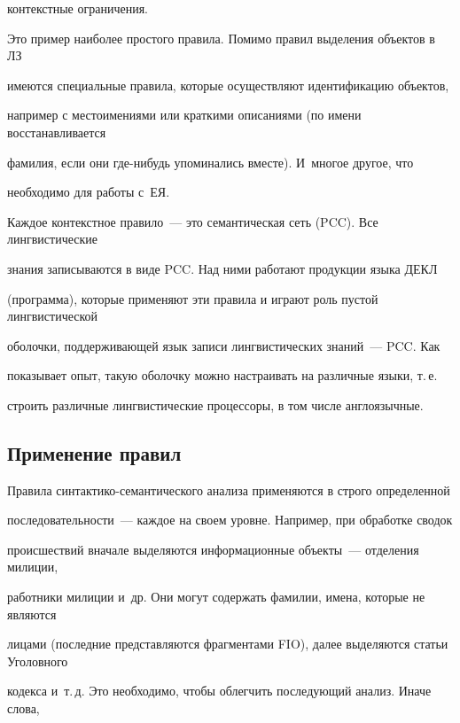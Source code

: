 контекстные ограничения.





Это пример наиболее простого правила. Помимо правил выделения объектов в ЛЗ 


имеются специальные правила, которые осуществляют идентификацию объектов, 


например с местоимениями или краткими описаниями (по имени восстанавливается 


фамилия, если они где-нибудь упоминались вместе). И~многое другое, что 


необходимо для работы с~ЕЯ.





Каждое контекстное правило~--- это семантическая сеть (PCC). Все лингвистические 


знания записываются в виде PCC. Над ними работают продукции языка ДЕКЛ 


(программа), которые применяют эти правила и играют роль пус\-той лингвистической 


оболочки, поддерживающей язык записи лингвистических знаний~--- PCC. Как 


показывает опыт, такую оболочку можно настраивать на различные языки, т.\,е.\ 


строить различные лингвистические процессоры, в том числе англоязычные.


    


    \subsection{Применение правил}


    


 Правила синтактико-семантического анализа применяются в строго определенной 


последовательности~--- каждое на своем уровне. Например, при обработке сводок 


происшествий вначале выделяются информационные объекты~--- отделения милиции, 


работники милиции и~др. Они могут содержать фамилии, имена, которые не являются 


лицами (последние представляются фрагментами {\sf FIO}), далее выделяются статьи Уголовного


кодекса и~т.\,д. Это необходимо, чтобы облегчить последующий анализ. Иначе слова, 


